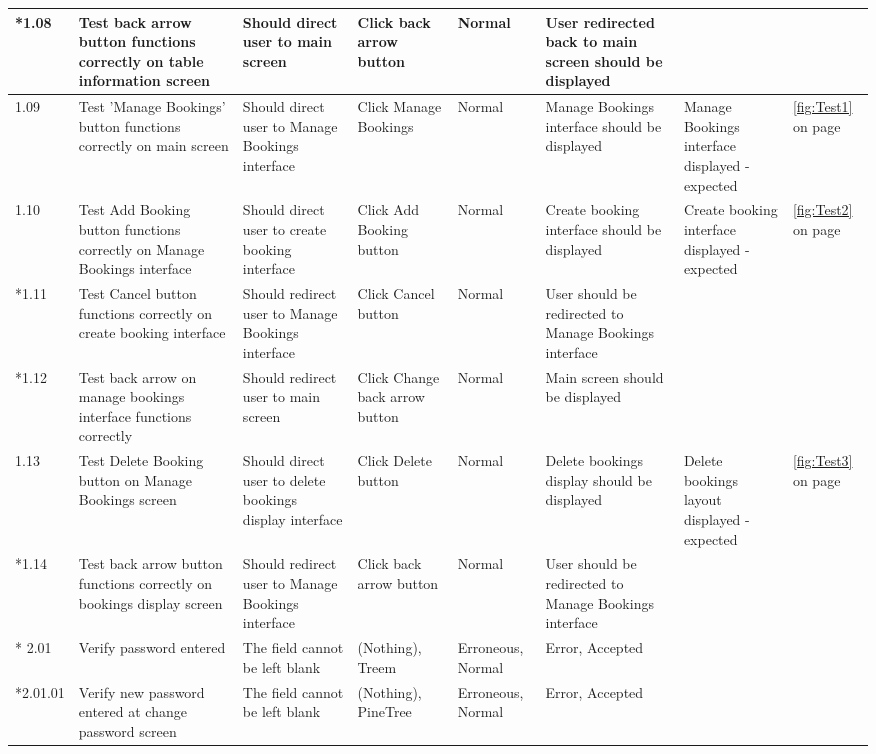 \begin{landscape}
\begin{center}
\begin{longtable}{|p{1.5cm}|p{2.5cm}|p{2.5cm}|p{2cm}|p{2cm}|p{2cm}|p{2cm}|p{2cm}|}
         \rowcolor{gray}*1.08 & Test back arrow button functions correctly on table information screen & Should direct user to main screen & Click back arrow button & Normal & User redirected back to main screen should be displayed &  &  \\ \hline
        1.09 & Test 'Manage Bookings' button functions correctly on main screen & Should direct user to Manage Bookings interface  & Click Manage Bookings & Normal & Manage Bookings interface should be displayed & Manage Bookings interface displayed - expected  & \ref{fig:Test1} on page \pageref{fig:Test1} \\ \hline
        1.10 & Test Add Booking button functions correctly on Manage Bookings interface & Should direct user to create booking interface  & Click Add Booking button & Normal & Create booking interface should be displayed & Create booking interface displayed - expected & \ref{fig:Test2} on page \pageref{fig:Test2}  \\ \hline
        \rowcolor{gray} *1.11 & Test Cancel button functions correctly on create booking interface & Should redirect user to Manage Bookings interface  & Click Cancel button & Normal & User should be redirected to Manage Bookings interface &  &  \\ \hline
        \rowcolor{gray} *1.12 & Test back arrow on manage bookings interface functions correctly & Should redirect user to main screen  & Click Change back arrow button & Normal & Main screen should be displayed &  &  \\ \hline
        1.13 & Test Delete Booking button on Manage Bookings screen & Should direct user to delete bookings display interface  & Click Delete button & Normal & Delete bookings display should be displayed  &Delete bookings layout displayed - expected  & \ref{fig:Test3} on page \pageref{fig:Test3}  \\ \hline
        \rowcolor{gray} *1.14 & Test back arrow button functions correctly on bookings display screen & Should redirect user to Manage Bookings interface  & Click back arrow button & Normal & User should be redirected to Manage Bookings interface &  &  \\ \hline
       \rowcolor{gray} * 2.01 & Verify password entered & The field cannot be left blank  & (Nothing), Treem & Erroneous, Normal & Error, Accepted &  &  \\ \hline
        \rowcolor{gray} *2.01.01 & Verify new password entered at change password screen & The field cannot be left blank  & (Nothing), PineTree & Erroneous, Normal & Error, Accepted &  &  \\ \hline

\end{longtable}
\end{center}
\end{landscape}
